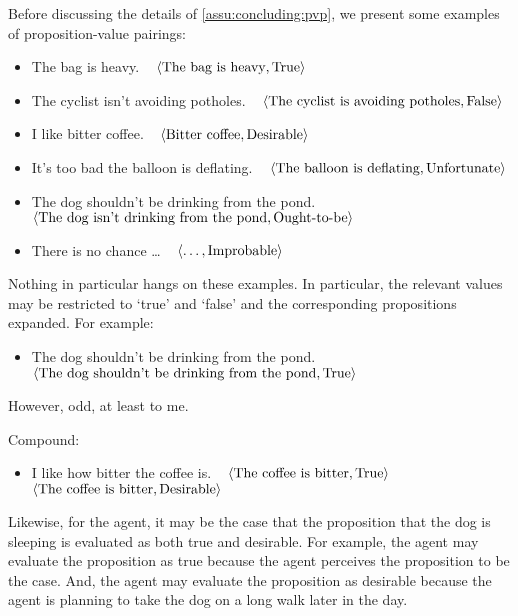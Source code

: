 \begin{note}
  Before discussing the details of \autoref{assu:concluding:pvp}, we present some examples of proposition-value pairings:

  \begin{itemize}
  \item
    The bag is heavy.\newline
    \mbox{ }\hfill%
    \(\langle \text{The bag is heavy}, \text{True} \rangle\)
  \item
    The cyclist isn't avoiding potholes.\newline
    \mbox{ }\hfill%
    \(\langle \text{The cyclist is avoiding potholes}, \text{False} \rangle\)
  \item I like bitter coffee.\newline
    \mbox{ }\hfill%
    \(\langle \text{Bitter coffee}, \text{Desirable} \rangle\)
  \item
    It's too bad the balloon is deflating.\newline
    \mbox{ }\hfill%
    \(\langle \text{The balloon is deflating}, \text{Unfortunate} \rangle\)
  \item
    The dog shouldn't be drinking from the pond.\newline
    \mbox{ }\hfill%
    \(\langle \text{The dog isn't drinking from the pond}, \text{Ought-to-be} \rangle\)
  \item
    There is no chance \dots
    \mbox{ }\hfill%
    \(\langle \text{\dots}, \text{Improbable} \rangle\)
  \end{itemize}

  Nothing in particular hangs on these examples.
  In particular, the relevant values may be restricted to `true' and `false' and the corresponding propositions expanded.
  For example:
  \begin{itemize}
  \item
    The dog shouldn't be drinking from the pond.\newline
    \mbox{ }\hfill%
    \(\langle \text{The dog shouldn't be drinking from the pond}, \text{True} \rangle\)
  \end{itemize}

  However, odd, at least to me.
\end{note}

\begin{note}
  Compound:
  \begin{itemize}
  \item I like how bitter the coffee is.\newline
    \mbox{ }\hfill%
    \(\langle \text{The coffee is bitter}, \text{True} \rangle\)\newline
    \mbox{ }\hfill%
    \(\langle \text{The coffee is bitter}, \text{Desirable} \rangle\)
  \end{itemize}

  Likewise, for the agent, it may be the case that the proposition that the dog is sleeping is evaluated as both true and desirable.
  For example, the agent may evaluate the proposition as true because the agent perceives the proposition to be the case.
  And, the agent may evaluate the proposition as desirable because the agent is planning to take the dog on a long walk later in the day.
\end{note}

